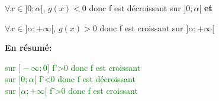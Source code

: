 \documentclass[12pt]{article}
\begin{document}
\begin{itemize}
\begin{itemize}
\begin{itemize}
$\forall x\in]0 ; \alpha[$, $g(x) < 0$ donc f est décroissant sur $]0 ; \alpha[$ \textbf{et} 

$\forall x\in]\alpha ; +\infty[$, $g(x) > 0$ donc f est croissant sur $]\alpha ; +\infty[$

\textbf{En résumé:}

\textcolor{green}{sur $]-\infty ; 0]$ f'>0 donc f est croissant \\sur $]0 ; \alpha[$ f'<0 donc f est décroissant\\sur $]\alpha ; +\infty[$ f'>0 donc f est croissant}
        \end{itemize}
    \end{itemize}
\end{itemize}
\end{document}
